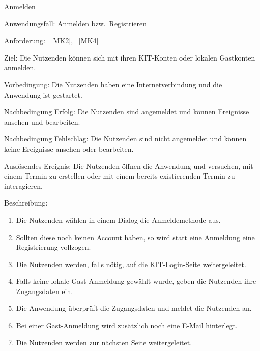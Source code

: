 \begin{function}{20}{Anmelden}
    \item[Anwendungsfall:] Anmelden bzw.\ Registrieren
    \item[Anforderung:]~\ref{MK2}, ~\ref{MK4}
    \item[Ziel:] Die Nutzenden können sich mit ihren KIT-Konten oder lokalen Gastkonten anmelden.
    \item[Vorbedingung:] Die Nutzenden haben eine Internetverbindung und die Anwendung ist gestartet.
    \item[Nachbedingung Erfolg:] Die Nutzenden sind angemeldet und können Ereignisse ansehen und bearbeiten.
    \item[Nachbedingung Fehlschlag:] Die Nutzenden sind nicht angemeldet und können keine Ereignisse ansehen oder bearbeiten.
    \item[Auslösendes Ereignis:] Die Nutzenden öffnen die Anwendung und versuchen, mit einem Termin zu erstellen oder mit einem bereits existierenden Termin zu interagieren.
    \item[Beschreibung:] ~
    \begin{enumerate}
        \item Die Nutzenden wählen in einem Dialog die Anmeldemethode aus.
        \item Sollten diese noch keinen Account haben, so wird statt eine Anmeldung eine Registrierung vollzogen.
        \item Die Nutzenden werden, falls nötig, auf die KIT-Login-Seite weitergeleitet.
        \item Falls keine lokale Gast-Anmeldung gewählt wurde, geben die Nutzenden ihre Zugangsdaten ein.
        \item Die Anwendung überprüft die Zugangsdaten und meldet die Nutzenden an.
        \item Bei einer Gast-Anmeldung wird zusätzlich noch eine E-Mail hinterlegt.
        \item Die Nutzenden werden zur nächsten Seite weitergeleitet.
    \end{enumerate}
\end{function}

\pagebreak

